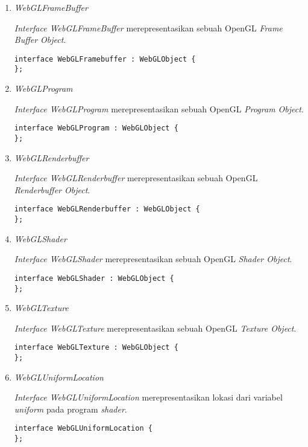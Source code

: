 \documentclass[a4paper,twoside]{article}
\begin{document}
\begin{enumerate}
\begin{enumerate}
\item {\it WebGLFrameBuffer}

	{\it Interface WebGLFrameBuffer} merepresentasikan sebuah OpenGL {\it Frame Buffer Object}.
	\begin{lstlisting}[caption={{\it Frame Buffer Object} pada OpenGL.}, captionpos=b]
interface WebGLFramebuffer : WebGLObject {
};
	\end{lstlisting}

\item {\it WebGLProgram}

	{\it Interface WebGLProgram} merepresentasikan sebuah OpenGL {\it Program Object}.
	\begin{lstlisting}[caption={{\it Program Object} pada OpenGL.}, captionpos=b]
interface WebGLProgram : WebGLObject {
};
	\end{lstlisting}

\item {\it WebGLRenderbuffer}

	{\it Interface WebGLRenderbuffer} merepresentasikan sebuah OpenGL {\it Renderbuffer Object}.
	\begin{lstlisting}[caption={{\it Renderbuffer Object} pada OpenGL.}, captionpos=b]
interface WebGLRenderbuffer : WebGLObject {
};
	\end{lstlisting}

\item {\it WebGLShader}

	{\it Interface WebGLShader} merepresentasikan sebuah OpenGL {\it Shader Object}.
	\begin{lstlisting}[caption={{\it Shader Object} pada OpenGL.}, captionpos=b]
interface WebGLShader : WebGLObject {
};
	\end{lstlisting}

\item {\it WebGLTexture}

	{\it Interface WebGLTexture} merepresentasikan sebuah OpenGL {\it Texture Object}.
	\begin{lstlisting}[caption={{\it Texture Object} pada OpenGL.}, captionpos=b]
interface WebGLTexture : WebGLObject {
};
	\end{lstlisting}
	
\item {\it WebGLUniformLocation}

	{\it Interface WebGLUniformLocation} merepresentasikan lokasi dari variabel {\it uniform} pada program {\it shader}.
	\begin{lstlisting}[caption={Lokasi dari variabel {\it uniform}.}, captionpos=b]
interface WebGLUniformLocation {
};
	\end{lstlisting}
	

\end{enumerate}
\end{enumerate}
\end{document}
